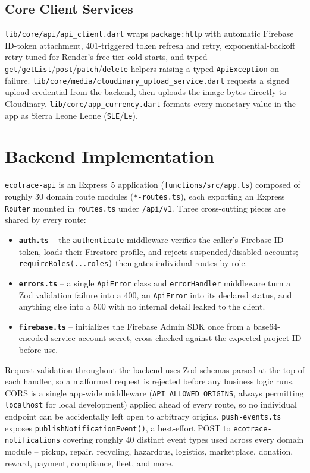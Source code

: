 \subsection{Core Client Services}
\texttt{lib/core/api/api\_client.dart} wraps \texttt{package:http} with
automatic Firebase ID-token attachment, 401-triggered token refresh and
retry, exponential-backoff retry tuned for Render's free-tier cold starts, and
typed \texttt{get}/\texttt{getList}/\texttt{post}/\texttt{patch}/\texttt{delete}
helpers raising a typed \texttt{ApiException} on failure.
\texttt{lib/core/media/cloudinary\_upload\_service.dart} requests a signed
upload credential from the backend, then uploads the image bytes directly to
Cloudinary. \texttt{lib/core/app\_currency.dart} formats every monetary value
in the app as Sierra Leone Leone (\texttt{SLE}/\texttt{Le}).

\section{Backend Implementation}

\texttt{ecotrace-api} is an Express~5 application (\texttt{functions/src/app.ts})
composed of roughly 30 domain route modules (\texttt{*-routes.ts}), each
exporting an Express \texttt{Router} mounted in \texttt{routes.ts} under
\texttt{/api/v1}. Three cross-cutting pieces are shared by every route:

\begin{itemize}
  \item \textbf{\texttt{auth.ts}} -- the \texttt{authenticate} middleware
    verifies the caller's Firebase ID token, loads their Firestore profile, and
    rejects suspended/disabled accounts; \texttt{requireRoles(...roles)} then
    gates individual routes by role.
  \item \textbf{\texttt{errors.ts}} -- a single \texttt{ApiError} class and
    \texttt{errorHandler} middleware turn a Zod validation failure into a 400,
    an \texttt{ApiError} into its declared status, and anything else into a 500
    with no internal detail leaked to the client.
  \item \textbf{\texttt{firebase.ts}} -- initializes the Firebase Admin SDK
    once from a base64-encoded service-account secret, cross-checked against
    the expected project ID before use.
\end{itemize}

Request validation throughout the backend uses Zod schemas parsed at the
top of each handler, so a malformed request is rejected before any business
logic runs. CORS is a single app-wide middleware
(\texttt{API\_ALLOWED\_ORIGINS}, always permitting \texttt{localhost} for
local development) applied ahead of every route, so no individual endpoint
can be accidentally left open to arbitrary origins. \texttt{push-events.ts}
exposes \texttt{publishNotificationEvent()}, a best-effort POST to
\texttt{ecotrace-notifications} covering roughly 40 distinct event types used
across every domain module -- pickup, repair, recycling, hazardous, logistics,
marketplace, donation, reward, payment, compliance, fleet, and more.

